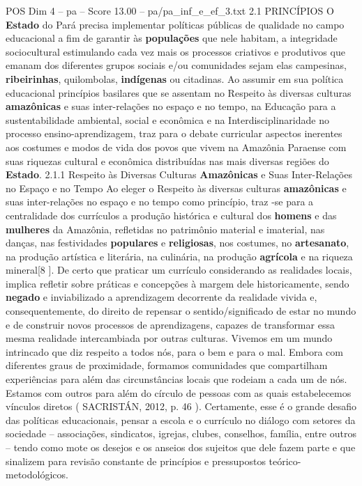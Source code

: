 \begin{textsample}{POS Dim 4 – pa – Score 13.00 – pa/pa\_inf\_e\_ef\_3.txt}  \label{ex:f4_pos_012}
2.1 PRINCÍPIOS O \textbf{Estado} do Pará precisa implementar políticas públicas de qualidade no campo educacional a fim de garantir às \textbf{populações} que nele habitam, a integridade sociocultural estimulando cada vez mais os processos criativos e produtivos que emanam dos diferentes grupos sociais e/ou comunidades sejam elas campesinas, \textbf{ribeirinhas}, quilombolas, \textbf{indígenas} ou citadinas.
Ao assumir em sua política educacional princípios basilares que se assentam no Respeito às diversas culturas \textbf{amazônicas} e suas inter-relações no espaço e no tempo, na Educação para a sustentabilidade ambiental, social e econômica e na Interdisciplinaridade no processo ensino-aprendizagem, traz para o debate curricular aspectos inerentes aos costumes e modos de vida dos povos que vivem na Amazônia Paraense com suas riquezas cultural e econômica distribuídas nas mais diversas regiões do \textbf{Estado}. 2.1.1 Respeito às Diversas Culturas \textbf{Amazônicas} e Suas Inter-Relações no Espaço e no Tempo Ao eleger o Respeito às diversas culturas \textbf{amazônicas} e suas inter-relações no espaço e no tempo como princípio, traz -se para a centralidade dos currículos a produção histórica e cultural dos \textbf{homens} e das \textbf{mulheres} da Amazônia, refletidas no patrimônio material e imaterial, nas danças, nas festividades \textbf{populares} e \textbf{religiosas}, nos costumes, no \textbf{artesanato}, na produção artística e literária, na culinária, na produção \textbf{agrícola} e na riqueza mineral[8 ].
De certo que praticar um currículo considerando as realidades locais, implica refletir sobre práticas e concepções à margem dele historicamente, sendo \textbf{negado} e inviabilizado a aprendizagem decorrente da realidade vivida e, consequentemente, do direito de repensar o sentido/significado de estar no mundo e de construir novos processos de aprendizagens, capazes de transformar essa mesma realidade intercambiada por outras culturas.
Vivemos em um mundo intrincado que diz respeito a todos nós, para o bem e para o mal.
Embora com diferentes graus de proximidade, formamos comunidades que compartilham experiências para além das circunstâncias locais que rodeiam a cada um de nós.
Estamos com outros para além do círculo de pessoas com as quais estabelecemos vínculos diretos ( SACRISTÁN, 2012, p. 46 ).
Certamente, esse é o grande desafio das políticas educacionais, pensar a escola e o currículo no diálogo com setores da sociedade – associações, sindicatos, igrejas, clubes, conselhos, família, entre outros – tendo como mote os desejos e os anseios dos sujeitos que dele fazem parte e que sinalizem para revisão constante de princípios e pressupostos teórico-metodológicos.

\end{textsample}
